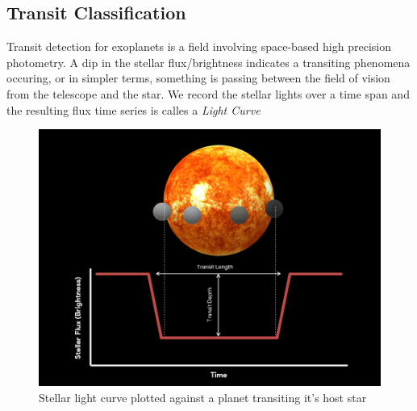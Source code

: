\subsection{Transit Classification}
Transit detection for exoplanets is a field involving space-based high precision photometry. A dip in the stellar flux/brightness indicates a transiting phenomena occuring, or in simpler terms, something is passing between the field of vision from the telescope and the star. We record the stellar lights over a time span and the resulting flux time series is calles a \emph{Light Curve}
\begin{figure}[h]
    \centering
    \includegraphics[scale=0.4]{Images/Transit.png}
    \caption{Stellar light curve plotted against a planet transiting it's host star}
    \label{fig:Transit}
\end{figure}

